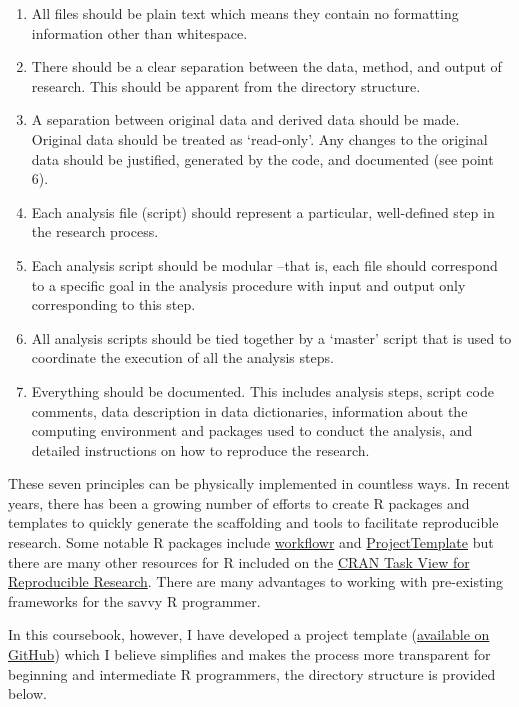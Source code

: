 \documentclass[
  letterpaper,
]{latex/krantz}
\providecommand{\tightlist}{%
  \setlength{\itemsep}{0pt}\setlength{\parskip}{0pt}}\usepackage{longtable,booktabs,array}
\begin{document}
\begin{enumerate}
\def\labelenumi{\arabic{enumi}.}
\tightlist
\item
  All files should be plain text which means they contain no formatting
  information other than whitespace.
\item
  There should be a clear separation between the data, method, and
  output of research. This should be apparent from the directory
  structure.
\item
  A separation between original data and derived data should be made.
  Original data should be treated as `read-only'. Any changes to the
  original data should be justified, generated by the code, and
  documented (see point 6).
\item
  Each analysis file (script) should represent a particular,
  well-defined step in the research process.
\item
  Each analysis script should be modular --that is, each file should
  correspond to a specific goal in the analysis procedure with input and
  output only corresponding to this step.
\item
  All analysis scripts should be tied together by a `master' script that
  is used to coordinate the execution of all the analysis steps.
\item
  Everything should be documented. This includes analysis steps, script
  code comments, data description in data dictionaries, information
  about the computing environment and packages used to conduct the
  analysis, and detailed instructions on how to reproduce the research.
\end{enumerate}

These seven principles can be physically implemented in countless ways.
In recent years, there has been a growing number of efforts to create R
packages and templates to quickly generate the scaffolding and tools to
facilitate reproducible research. Some notable R packages include
\href{https://jdblischak.github.io/workflowr/}{workflowr} and
\href{http://projecttemplate.net/}{ProjectTemplate} but there are many
other resources for R included on the
\href{https://cran.r-project.org/web/views/ReproducibleResearch.html}{CRAN
Task View for Reproducible Research}. There are many advantages to
working with pre-existing frameworks for the savvy R programmer.

In this coursebook, however, I have developed a project template
(\href{https://github.com/lin380/project_template}{available on GitHub})
which I believe simplifies and makes the process more transparent for
beginning and intermediate R programmers, the directory structure is
provided below.
\end{document}

